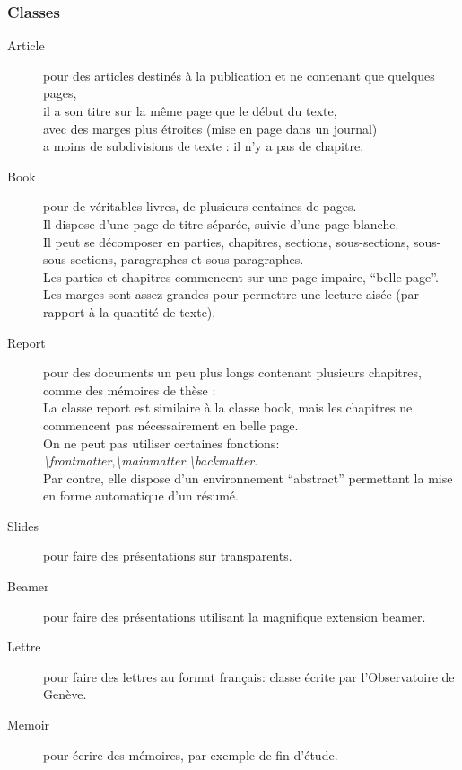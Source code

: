 \documentclass[a4paper,12pt]{report}
\begin{document}
			\subsubsection{Classes}
				\begin{description}
					\item[Article] pour des articles destinés à la publication et ne contenant que quelques pages,\\
						il a son titre sur la même page que le début du texte,\\
						avec des marges plus étroites (mise en page dans un journal)\\
						a moins de subdivisions de texte : il n'y a pas de chapitre.
			 		\item[Book] pour de véritables livres, de plusieurs centaines de pages.\\
			 			Il dispose d'une page de titre séparée, suivie d'une page blanche.\\
			 			Il peut se décomposer en parties, chapitres, sections, sous-sections, sous-sous-sections, paragraphes et sous-paragraphes.\\
			 			Les parties et chapitres commencent sur une page impaire, \enquote{belle page}.\\
			 			Les marges sont assez grandes pour permettre une lecture aisée (par rapport à la quantité de texte).
					\item[Report] pour des documents un peu plus longs contenant plusieurs chapitres, comme des mémoires de thèse :\\
						La classe report est similaire à la classe book, mais les chapitres ne commencent pas nécessairement en belle page.\\
			 			On ne peut pas utiliser certaines fonctions: \textit{\textbackslash frontmatter},\textit{\textbackslash mainmatter},\textit{\textbackslash backmatter}.\\
						Par contre, elle dispose d'un environnement \enquote{abstract} permettant la mise en forme automatique d'un résumé.
					\item[Slides] pour faire des présentations sur transparents.
					\item[Beamer] pour faire des présentations utilisant la magnifique extension beamer.
					\item[Lettre] pour faire des lettres au format français: classe écrite par l'Observatoire de Genève.
					\item[Memoir] pour écrire des mémoires, par exemple de fin d'étude.
				\end{description} 
\end{document}
